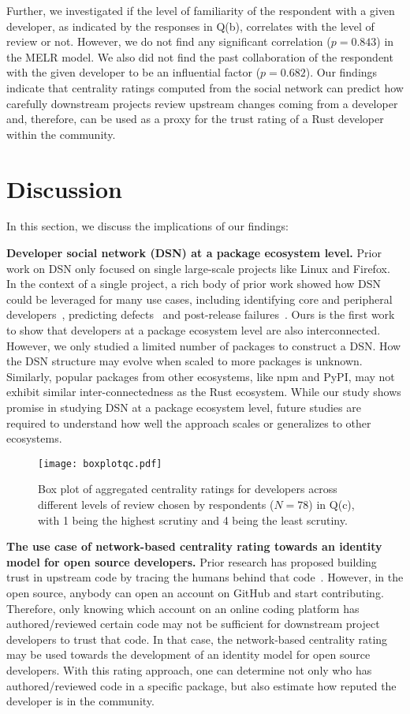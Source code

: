 \documentclass[10pt,journal,compsoc]{IEEEtran}
\begin{document}
Further, we investigated if the level of familiarity of the respondent with a given developer, as indicated by the responses in Q(b), correlates with the level of review or not. However, we do not find any significant correlation ($p=0.843$) in the MELR model. We also did not find the past collaboration of the respondent with the given developer to be an influential factor ($p=0.682$). Our findings indicate that centrality ratings computed from the social network can predict how carefully downstream projects review upstream changes coming from a developer and, therefore, can be used as a proxy for the trust rating of a Rust developer within the community.


\section{Discussion}
\label{sec:discussion}
In this section, we discuss the implications of our findings:

\textbf{Developer social network (DSN) at a package ecosystem level.} Prior work on DSN only focused on single large-scale projects like Linux and Firefox. In the context of a single project, a rich body of prior work showed how DSN could be leveraged for many use cases, including identifying core and peripheral developers~\cite{bosu2014identifying},
predicting defects~\cite{abreu2009developer} and post-release failures~\cite{meneely2008predicting}. Ours is the first work to show that developers at a package ecosystem level are also interconnected.  
However, we only studied a limited number of packages to construct a DSN. How the DSN structure may evolve when scaled to more packages is unknown. Similarly, popular packages from other ecosystems, like npm and PyPI, may not exhibit similar inter-connectedness as the Rust ecosystem. While our study shows promise in studying DSN at a package ecosystem level, future studies are required to understand how well the approach scales or generalizes to other ecosystems. 

\begin{figure}
    \centering
    \texttt{[image: boxplotqc.pdf]}
    \caption{Box plot of aggregated centrality ratings for developers across different levels of review chosen by respondents ($N=78$) in Q(c), with 1 being the highest scrutiny and 4 being the least scrutiny.}
    \label{fig:boxplot}
\end{figure}

\textbf{The use case of network-based centrality rating towards an identity model for open source developers.} Prior research has proposed building trust in upstream code by tracing the humans behind that code~\cite{imtiaz2022phantom}. However, in the open source, anybody can open an account on GitHub and start contributing. Therefore, only knowing which account on an online coding platform has authored/reviewed certain code may not be sufficient for downstream project developers to trust that code. In that case, the network-based centrality rating 
may be used towards the development of an identity model for open source developers. With this rating approach, one can determine not only who has authored/reviewed code in a specific package, but also estimate how reputed the developer is in the community. 
\end{document}
